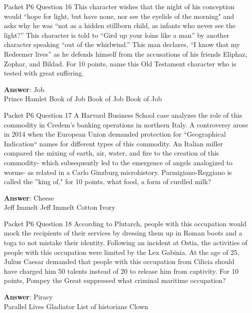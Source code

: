 \begin{frame}{Packet P6 Question 16}
This character wishes that the night of his   conception would “hope for light, but have none, nor see the eyelids of the morning" and asks why he was “not as a hidden stillborn child, as infants who never see the light?” This character is told to “Gird up your loins like a man” by another character speaking “out of the whirlwind.” This man declares, “I know that my Redeemer lives” as he defends himself from the accusations of his friends Eliphaz, Zophar, and     Bildad. For 10 points, name this Old Testament character who is tested with great suffering.  

\textbf{Answer}: Job\\
 Prince Hamlet
 Book of Job
 Book of Job
 Book of Job
\end{frame}

\begin{frame}{Packet P6 Question 17}
A Harvard Business School   case analyzes the   role of this commodity in Credem's banking operations in northern Italy. A controversy arose in 2014 when the European Union demanded protection for “Geographical Indication`` names for different types of this commodity. An Italian miller compared the mixing of earth, air, water, and fire to the creation of this commodity- which subsequently led to the emergence of angels analogized to worms- as related in a Carlo Ginzburg microhistory. Parmigiano-Reggiano is called the ''king of," for 10 points, what food, a form of curdled milk?    

\textbf{Answer}: Cheese\\
 Jeff Immelt
 Jeff Immelt
 Cotton
 Ivory
\end{frame}

\begin{frame}{Packet P6 Question 18}
According to Plutarch,   people with this occupation would mock the recipients of their services by dressing them up in Roman boots and a toga to   not mistake their identity. Following an incident at Ostia, the activities of people with this occupation were limited by the Lex Gabinia. At the age of 25, Julius Caesar demanded that people with this occupation from Cilicia should have charged him 50 talents   instead of 20 to release him from captivity. For 10 points, Pompey the Great suppressed what criminal maritime occupation?  

\textbf{Answer}: Piracy\\
 Parallel Lives
 Gladiator
 List of historians
 Clown
\end{frame}

